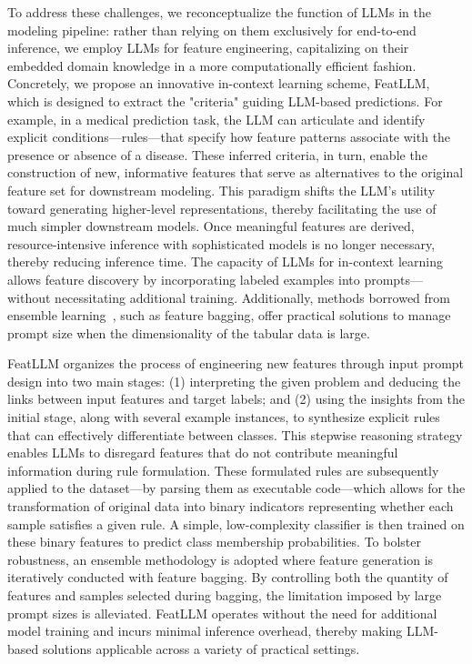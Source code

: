 To address these challenges, we reconceptualize the function of LLMs in the modeling pipeline: rather than relying on them exclusively for end-to-end inference, we employ LLMs for feature engineering, capitalizing on their embedded domain knowledge in a more computationally efficient fashion. Concretely, we propose an innovative in-context learning scheme, \textsf{FeatLLM}, which is designed to extract the "criteria" guiding LLM-based predictions. For example, in a medical prediction task, the LLM can articulate and identify explicit conditions—rules—that specify how feature patterns associate with the presence or absence of a disease. These inferred criteria, in turn, enable the construction of new, informative features that serve as alternatives to the original feature set for downstream modeling. This paradigm shifts the LLM’s utility toward generating higher-level representations, thereby facilitating the use of much simpler downstream models. Once meaningful features are derived, resource-intensive inference with sophisticated models is no longer necessary, thereby reducing inference time. The capacity of LLMs for in-context learning allows feature discovery by incorporating labeled examples into prompts—without necessitating additional training. Additionally, methods borrowed from ensemble learning~\cite{breiman2001random}, such as feature bagging, offer practical solutions to manage prompt size when the dimensionality of the tabular data is large.

\textsf{FeatLLM} organizes the process of engineering new features through input prompt design into two main stages: (1) interpreting the given problem and deducing the links between input features and target labels; and (2) using the insights from the initial stage, along with several example instances, to synthesize explicit rules that can effectively differentiate between classes. This stepwise reasoning strategy enables LLMs to disregard features that do not contribute meaningful information during rule formulation. These formulated rules are subsequently applied to the dataset—by parsing them as executable code—which allows for the transformation of original data into binary indicators representing whether each sample satisfies a given rule. A simple, low-complexity classifier is then trained on these binary features to predict class membership probabilities. To bolster robustness, an ensemble methodology is adopted where feature generation is iteratively conducted with feature bagging. By controlling both the quantity of features and samples selected during bagging, the limitation imposed by large prompt sizes is alleviated. \textsf{FeatLLM} operates without the need for additional model training and incurs minimal inference overhead, thereby making LLM-based solutions applicable across a variety of practical settings.

